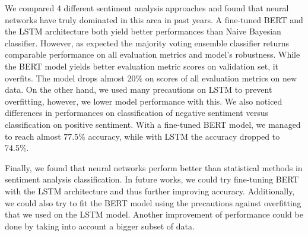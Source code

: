 \documentclass[conference]{IEEEtran}
\begin{document}
We compared 4 different sentiment analysis approaches and found that neural networks have truly dominated in this area in past years. A fine-tuned BERT and the LSTM architecture both yield better performances than Naive Bayesian classifier. However, as expected the majority voting ensemble classifier returns comparable performance on all evaluation metrics and model's robustness. While the BERT model yields better evaluation metric scores on validation set, it overfits. The model drops almost 20\% on scores of all evaluation metrics on new data. On the other hand, we used many precautions on LSTM to prevent overfitting, however, we lower model performance with this. We also noticed differences in performances on classification of negative sentiment versus classification on positive sentiment. With a fine-tuned BERT model, we managed to reach almost 77.5\% accuracy, while with LSTM the accuracy dropped to 74.5\%.

Finally, we found that neural networks perform better than statistical methods in sentiment analysis classification. In future works, we could try fine-tuning BERT with the LSTM architecture and thus further improving accuracy. Additionally, we could also try to fit the BERT model using the precautions against overfitting that we used on the LSTM model. Another improvement of performance could be done by taking into account a bigger subset of data.

%
%

\end{document}

